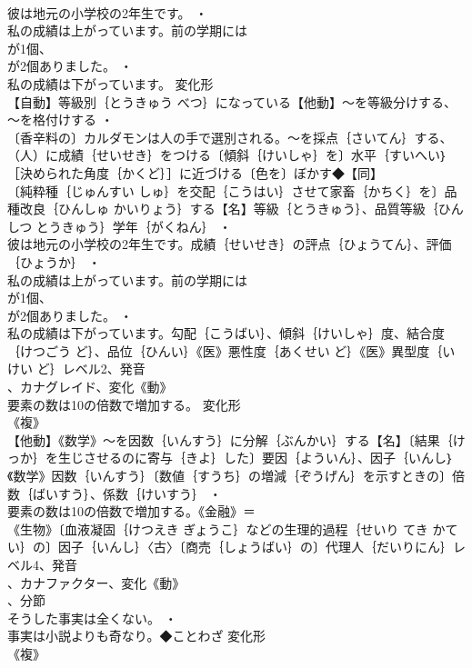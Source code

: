 \documentclass[8pt]{extreport}
\begin{document}
\begin{CJK}{UTF8}{min}
\\	彼は地元の小学校の2年生です。 ・
\\	私の成績は上がっています。前の学期には
\\	が1個、
\\	が2個ありました。 ・
\\	私の成績は下がっています。	変化形 
\\	【自動】等級別｛とうきゅう べつ｝になっている【他動】～を等級分けする、～を格付けする ・
\\	〔香辛料の〕カルダモンは人の手で選別される。～を採点｛さいてん｝する、（人）に成績｛せいせき｝をつける〔傾斜｛けいしゃ｝を〕水平｛すいへい｝［決められた角度｛かくど｝］に近づける〔色を〕ぼかす◆【同】
\\	〔純粋種｛じゅんすい しゅ｝を交配｛こうはい｝させて家畜｛かちく｝を〕品種改良｛ひんしゅ かいりょう｝する【名】等級｛とうきゅう｝、品質等級｛ひんしつ とうきゅう｝学年｛がくねん｝ ・
\\	彼は地元の小学校の2年生です。成績｛せいせき｝の評点｛ひょうてん｝、評価｛ひょうか｝ ・
\\	私の成績は上がっています。前の学期には
\\	が1個、
\\	が2個ありました。 ・
\\	私の成績は下がっています。勾配｛こうばい｝、傾斜｛けいしゃ｝度、結合度｛けつごう ど｝、品位｛ひんい｝《医》悪性度｛あくせい ど｝《医》異型度｛いけい ど｝レベル2、発音
\\	、カナグレイド、変化《動》
\\	要素の数は10の倍数で増加する。	変化形 
\\	《複》
\\	【他動】《数学》～を因数｛いんすう｝に分解｛ぶんかい｝する【名】〔結果｛けっか｝を生じさせるのに寄与｛きよ｝した〕要因｛よういん｝、因子｛いんし｝《数学》因数｛いんすう｝〔数値｛すうち｝の増減｛ぞうげん｝を示すときの〕倍数｛ばいすう｝、係数｛けいすう｝ ・
\\	要素の数は10の倍数で増加する。《金融》＝
\\	《生物》〔血液凝固｛けつえき ぎょうこ｝などの生理的過程｛せいり てき かてい｝の〕因子｛いんし｝〈古〉〔商売｛しょうばい｝の〕代理人｛だいりにん｝レベル4、発音
\\	、カナファクター、変化《動》
\\	、分節
\\	そうした事実は全くない。 ・
\\	事実は小説よりも奇なり。◆ことわざ	変化形 
\\	《複》

\end{CJK}
\end{document}

